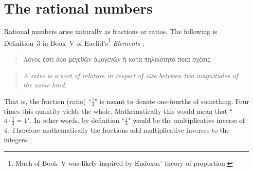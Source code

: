 \documentclass[../main.tex]{subfiles}
\begin{document}
\section{The rational numbers}\label{sec:the_natural_numbers_integers_and_rational_numbers:the_rational_numbers}
Rational numbers arise naturally as fractions or ratios. The following is Definition~3 in Book~V of Euclid's\footnote{Much of Book~V was likely inspired by Eudoxus' theory of proportion.} \textit{Elements} \cite{Heath1926}:
\begin{quote}
    \textgreek{Λόγος ἐστὶ δύο μεγεθῶν ὁμογενῶν ἡ κατὰ πηλικότητά ποια σχέσις.}
\end{quote}
\begin{quote}
    \textit{A ratio is a sort of relation in respect of size between two magnitudes of the same kind.}
\end{quote}
That is, the fraction (ratio) ``$\frac{1}{4}$" is meant to denote one-fourths of something. Four times this quantity yields the whole. Mathematically this would mean that ``$4\cdot\frac{1}{4}=1$". In other words, by definition ``$\frac{1}{4}$" would be the multiplicative inverse of $4$. Therefore mathematically the fractions add multiplicative inverses to the integers.
\end{document}
